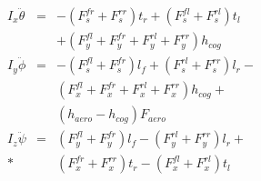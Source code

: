 \documentclass[journal]{IEEEtran}
\begin{document}
\begin{subequations}\label{fourWheelRotation.eq}
\begin{eqnarray}
I_x \ddot\theta &=&-(F_{s}^{fr}+F_{s}^{rr})t_r+(F_{s}^{fl}+F_{s}^{rl})t_l \\
&& + (F_{y}^{fl}+F_{y}^{fr}+F_{y}^{rl}+F_{y}^{rr})h_{cog} \nonumber\\
I_y \ddot\phi &=& -(F_{s}^{fl}+F_{s}^{fr})l_f + (F_{s}^{rl}+F_{s}^{rr})l_r -  \\
&&(F_{x}^{fl}+F_{x}^{fr}+F_{x}^{rl}+F_{x}^{rr})h_{cog} + \nonumber \\ 
&& (h_{aero}-h_{cog})F_{aero} \nonumber\\
I_z \ddot\psi &=& (F_{y}^{fl} + F_{y}^{fr})l_f - (F_{y}^{rl}+F_{y}^{rr})l_r + \label{4wm3.eq}\\*
&&(F_{x}^{fr}+F_{x}^{rr})t_r-(F_{x}^{fl}+F_{x}^{rl})t_l \nonumber
\end{eqnarray}
\end{subequations}
\end{document}
